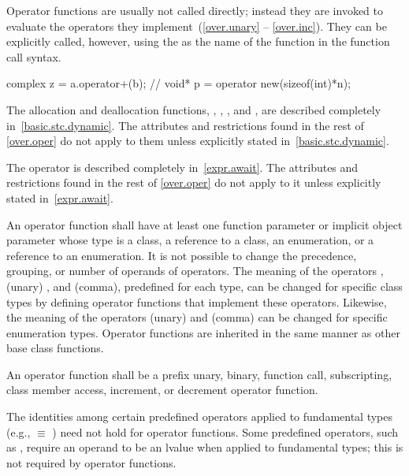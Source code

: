 \pnum
{}%
Operator functions are usually not called directly; instead they are invoked
to evaluate the operators they implement~(\ref{over.unary} -- \ref{over.inc}).
They can be explicitly called, however, using the
as the name of the function in the function call syntax.
\begin{example}
\begin{codeblock}
complex z = a.operator+(b);     // 
void* p = operator new(sizeof(int)*n);
\end{codeblock}
\end{example}

\pnum
The allocation and deallocation functions,
 ,
 ,
 , and
 ,
are described completely in~\ref{basic.stc.dynamic}.
The attributes and restrictions
found in the rest of \ref{over.oper} do not apply to them unless explicitly
stated in~\ref{basic.stc.dynamic}.

\pnum
The  operator is described completely in~\ref{expr.await}.
The attributes and restrictions
found in the rest of \ref{over.oper} do not apply to it unless explicitly
stated in~\ref{expr.await}.

\pnum
{}%
An operator function
shall have at least one
function parameter or implicit object parameter whose type is
a class, a reference to a class, an
enumeration, or a reference to an enumeration.
It is not possible to change the precedence, grouping, or number of operands
of operators.
The meaning of
the operators \tcode{=}, (unary) \tcode{\&}, and \tcode{,} (comma),
predefined for each type, can be changed for specific class types by
defining operator functions that implement these operators.
Likewise, the meaning of the operators (unary) \tcode{\&} and \tcode{,} (comma)
can be changed for specific enumeration types.
%
Operator functions are inherited in the same manner as other base class
functions.

\pnum
An operator function shall be a
prefix unary, binary, function call, subscripting, class member access, increment, or decrement
operator function.

\pnum
{}%
\begin{note}
The identities among certain predefined operators applied to fundamental types
(e.g.,
 $\equiv$
)
need not hold for operator functions.
Some predefined operators, such as
\tcode{+=},
require an operand to be an lvalue when applied to fundamental types;
this is not required by operator functions.
\end{note}

